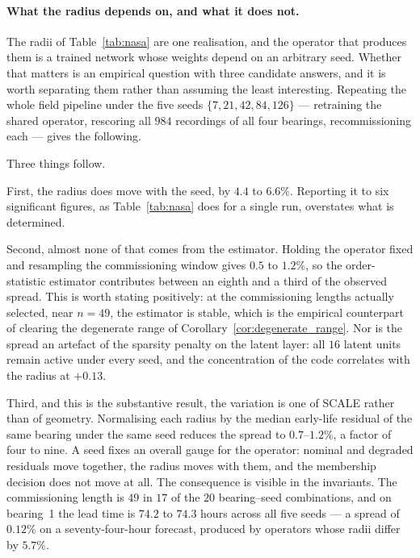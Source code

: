 \documentclass[a4paper]{cas-sc}
\begin{document}
\paragraph{What the radius depends on, and what it does not.}
The radii of Table~\ref{tab:nasa} are one realisation, and the operator that
produces them is a trained network whose weights depend on an arbitrary seed.
Whether that matters is an empirical question with three candidate answers,
and it is worth separating them rather than assuming the least interesting.
Repeating the whole field pipeline under the five seeds
\(\{7,21,42,84,126\}\) --- retraining the shared operator, rescoring all
\(984\) recordings of all four bearings, recommissioning each --- gives the
following.



Three things follow.

First, the radius does move with the seed, by \(4.4\) to \(6.6\%\). Reporting
it to six significant figures, as Table~\ref{tab:nasa} does for a single run,
overstates what is determined.

Second, almost none of that comes from the estimator. Holding the operator
fixed and resampling the commissioning window gives \(0.5\) to \(1.2\%\), so
the order-statistic estimator contributes between an eighth and a third of the
observed spread. This is worth stating positively: at the commissioning
lengths actually selected, near \(n=49\), the estimator is stable, which is
the empirical counterpart of clearing the degenerate range of
Corollary~\ref{cor:degenerate_range}. Nor is the spread an artefact of the
sparsity penalty on the latent layer: all \(16\) latent units remain active
under every seed, and the concentration of the code correlates with the radius
at \(+0.13\).

Third, and this is the substantive result, the variation is one of SCALE
rather than of geometry. Normalising each radius by the median early-life
residual of the same bearing under the same seed reduces the spread to
\(0.7\)--\(1.2\%\), a factor of four to nine. A seed fixes an overall gauge
for the operator: nominal and degraded residuals move together, the radius
moves with them, and the membership decision does not move at all. The
consequence is visible in the invariants. The commissioning length is \(49\)
in \(17\) of the \(20\) bearing--seed combinations, and on bearing~1 the lead
time is \(74.2\) to \(74.3\) hours across all five seeds --- a spread of
\(0.12\%\) on a seventy-four-hour forecast, produced by operators whose radii
differ by \(5.7\%\).
\end{document}
